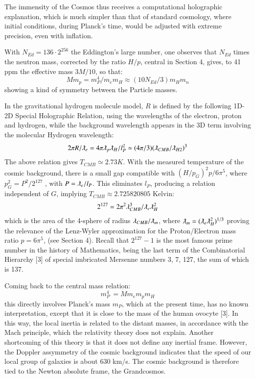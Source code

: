 \documentclass[twoside,draft]{article}
\begin{document}
\begin{sloppypar}
{The immensity of the Cosmos thus receives a computational holographic explanation, which is much simpler
than that of standard cosmology, where initial conditions, during Planck's time, would be adjusted with
extreme precision, even with inflation. 

With $N_{Ed} = 136 \cdot2^{256}$ the Eddington's large number, one observes that $N_{Ed}$ times the neutron mass, corrected by the ratio $H/p$, central in Section 4, gives, to 41 ppm the effective mass $3M/10$, so that:
\begin{equation}
Mm_p = m_P^4/m_em_H\approx(10N_{Ed}/3)m_Hm_n 
\end{equation}
showing a kind of symmetry between the Particle masses.

In the gravitational hydrogen molecule model, $R$ is defined by the following 1D-2D Special
Holographic Relation, using the wavelengths of the electron, proton and hydrogen, while the background wavelength appears in the 3D term involving the molecular Hydrogen wavelength:
\begin{equation}
2 \pi R/\lambdabar_{e} = 4 \pi \lambdabar_{p} \lambdabar_{H} /l_{P}^2 \simeq (4\pi/3)(\lambdabar_{CMB} /\lambdabar_{H2})^{3}
\end{equation}
The above relation gives $T_{CMB} \simeq 2.73 K$. With the measured temperature of the cosmic
background, there is a small gap compatible with $(H/p_G)^2 p/6\pi^5 $, where $p_{G}^{2} = P^{2} /2^{127}$ , with $P = \lambdabar_{e} /l_{P}$. 
This eliminates $l_{P}$, producing a relation independent of $G$, implying $T_{CMB} \approx 2.725820805$ Kelvin:
$$2^{127} = 2\pi^{2} \lambda_{CMB}^{3} /\lambdabar_{e} \lambdabar_{H}^2$$
which is the area of the 4-sphere of radius $\lambda_{CMB} / \lambdabar_{m}$, where $\lambdabar_{m} = (\lambdabar_{e} \lambdabar_{H}^2)^{1/3} $ proving the relevance of
the Lenz-Wyler approximation for the Proton/Electron mass ratio $p = 6\pi^{5}$, (see Section 4). Recall
that $2^{127} - 1$ is the most famous prime number in the history of Mathematics, being the last term of
the Combinatorial Hierarchy [3] of special imbricated Mersenne numbers 3, 7, 127, the sum of which is 137.

Coming back to the central mass relation:
\begin{equation}
m_{P}^{4}\, = M m_{e} m_{p} m_{H}
\end{equation}
this directly involves Planck's mass $m_{P}$, which at the present time, has no known interpretation, except
that it is close to the mass of the human ovocyte [3]. In this way, the local inertia is related to the distant
masses, in accordance with the Mach principle, which the relativity theory does not explain.
Another shortcoming of this theory is that it does not define any inertial frame. However, the
Doppler assymmetry of the cosmic background indicates that the speed of our local group of galaxies is about
630 km/s. The cosmic background is therefore tied to the Newton absolute frame, the Grandcosmos.

}
\end{sloppypar}
\end{document}
